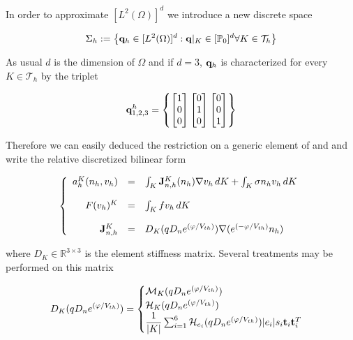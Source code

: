 In order to approximate $[L^2(\Omega)]^d$ we introduce a new discrete space

\begin{equation}
\Sigma_h := \left\{   \mathbf{q}_h \in  [L^2(\Omega)]^d : \mathbf{q}|_{K} \in [\mathbb{P}_0]^d \forall K \in \mathcal{T}_h\right\}
\end{equation} 

As usual $d$ is the dimension of $\Omega$ and if $d=3$, $\mathbf{q}_h$ is characterized for every $K \in \mathcal{T}_h$ by the triplet

\begin{equation}
\label{eq: form of qh}
\mathbf{q}^h_{1,2,3} = \left\{ \begin{bmatrix} 1 \\ 0 \\ 0 \end{bmatrix}  \begin{bmatrix} 0 \\ 1 \\ 0 \end{bmatrix}  \begin{bmatrix} 0 \\ 0 \\ 1 \end{bmatrix}  \right\}
\end{equation}

Therefore we can easily deduced the restriction on a generic element of  and  and write the relative discretized bilinear form

\begin{equation}
\label{eq: LEC discretized general}
\left\{
\begin{array}{rcl}
a_h^K(n_h,v_h) & = & \int_{K}\mathbf{ J}_{n,h}^K(n_h) \nabla v_h \, dK + \int_{K} \sigma n_h v_h \, dK 
\\
\\
F(v_h)^K & = & \int_K f v_h \, dK
\\
\\
\mathbf{J}_{n,h}^K & = & D_K(qD_n e^{(\varphi/V_{th})}) \nabla  (e^{(-\varphi / V_{th})}n_h)
\end{array}
\right.
\end{equation}

where $D_K \in \mathbb{R}^{3\times 3}$ is the element stiffness matrix. Several treatments may be performed on this matrix

\begin{equation}
\label{eq: vari diffusion coeff}
 D_K(qD_n e^{(\varphi/V_{th})}) = 
 	\begin{cases}
		  \mathcal{M}_K(qD_n e^{(\varphi/V_{th})}) \\
		  \mathcal{H}_K(qD_n e^{(\varphi/V_{th})}) \\
 		  \dfrac{1}{|K|}\sum_{i=1}^6 \mathcal{H}_{e_i}(qD_ne^{(\varphi/V_{th})}) |e_i| s_i \mathbf{t}_i \mathbf{t}_i^T
 		 \end{cases}
\end{equation}

